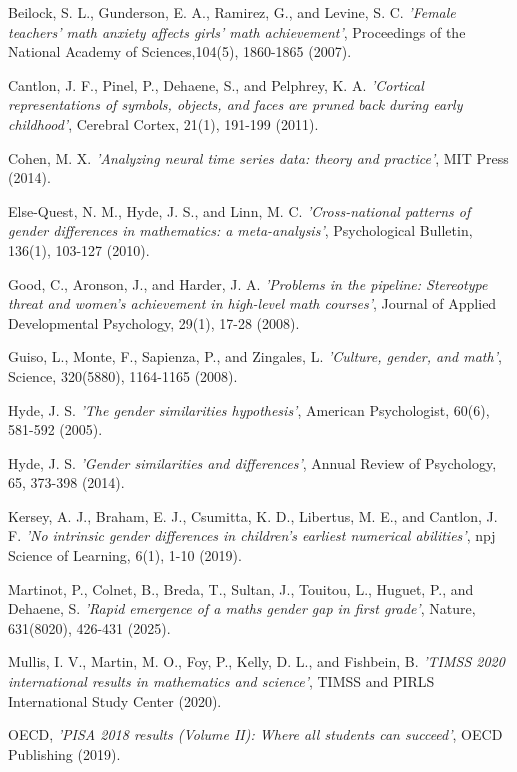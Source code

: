 \documentclass[12pt, a4paper]{article}
\begin{document}
\newpage
\begin{thebibliography}{99}
Beilock, S. L., Gunderson, E. A., Ramirez, G., and Levine, S. C.
{\it 'Female teachers' math anxiety affects girls' math achievement'},
Proceedings of the National Academy of Sciences,104(5), 1860-1865 (2007).

Cantlon, J. F., Pinel, P., Dehaene, S., and Pelphrey, K. A.
{\it 'Cortical representations of symbols, objects, and faces are pruned back during early childhood'},
Cerebral Cortex, 21(1), 191-199 (2011).

Cohen, M. X.
{\it 'Analyzing neural time series data: theory and practice'},
MIT Press (2014).

Else-Quest, N. M., Hyde, J. S., and Linn, M. C.
{\it 'Cross-national patterns of gender differences in mathematics: a meta-analysis'},
Psychological Bulletin, 136(1), 103-127 (2010).

Good, C., Aronson, J., and Harder, J. A.
{\it 'Problems in the pipeline: Stereotype threat and women's achievement in high-level math courses'},
Journal of Applied Developmental Psychology, 29(1), 17-28 (2008).

Guiso, L., Monte, F., Sapienza, P., and Zingales, L.
{\it 'Culture, gender, and math'},
Science, 320(5880), 1164-1165 (2008).

Hyde, J. S.
{\it 'The gender similarities hypothesis'},
American Psychologist, 60(6), 581-592 (2005).

Hyde, J. S.
{\it 'Gender similarities and differences'},
Annual Review of Psychology, 65, 373-398 (2014).

Kersey, A. J., Braham, E. J., Csumitta, K. D., Libertus, M. E., and Cantlon, J. F.
{\it 'No intrinsic gender differences in children's earliest numerical abilities'},
npj Science of Learning, 6(1), 1-10 (2019).

Martinot, P., Colnet, B., Breda, T., Sultan, J., Touitou, L., Huguet, P., and Dehaene, S.
{\it 'Rapid emergence of a maths gender gap in first grade'},
Nature, 631(8020), 426-431 (2025).

Mullis, I. V., Martin, M. O., Foy, P., Kelly, D. L., and Fishbein, B.
{\it 'TIMSS 2020 international results in mathematics and science'},
TIMSS and PIRLS International Study Center (2020).

OECD,
{\it 'PISA 2018 results (Volume II): Where all students can succeed'}, 
OECD Publishing (2019).


\end{thebibliography}
\end{document}

